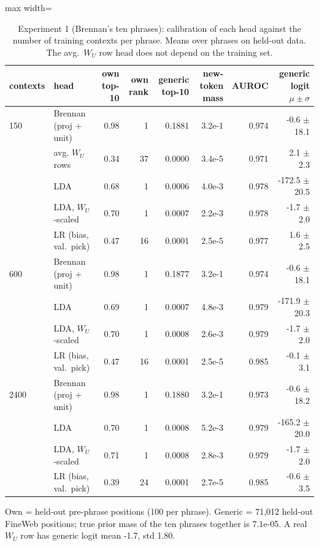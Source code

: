 \begin{table}[t]
\centering
\footnotesize
\caption{Experiment 1 (Brennan's ten phrases): calibration of each head against the number of training contexts per phrase. Means over phrases on held-out data. The avg.\ $W_U$ row head does not depend on the training set.}
\label{tab:e1_headline}
\begin{adjustbox}{max width=\textwidth}
\begin{tabular}{llrrrrrr}
\toprule
contexts & head & own top-10 & own rank & generic top-10 & new-token mass & AUROC & generic logit $\mu\pm\sigma$ \\
\midrule
150 & Brennan (proj + unit) & 0.98 & 1 & 0.1881 & 3.2e-1 & 0.974 & -0.6 $\pm$ 18.1 \\
 & avg. $W_U$ rows & 0.34 & 37 & 0.0000 & 3.4e-5 & 0.971 & 2.1 $\pm$ 2.3 \\
 & LDA & 0.68 & 1 & 0.0006 & 4.0e-3 & 0.978 & -172.5 $\pm$ 20.5 \\
 & LDA, $W_U$-scaled & 0.70 & 1 & 0.0007 & 2.2e-3 & 0.978 & -1.7 $\pm$ 2.0 \\
 & LR (bias, val.\ pick) & 0.47 & 16 & 0.0001 & 2.5e-5 & 0.977 & 1.6 $\pm$ 2.5 \\
\midrule
600 & Brennan (proj + unit) & 0.98 & 1 & 0.1877 & 3.2e-1 & 0.974 & -0.6 $\pm$ 18.1 \\
 & LDA & 0.69 & 1 & 0.0007 & 4.8e-3 & 0.979 & -171.9 $\pm$ 20.3 \\
 & LDA, $W_U$-scaled & 0.70 & 1 & 0.0008 & 2.6e-3 & 0.979 & -1.7 $\pm$ 2.0 \\
 & LR (bias, val.\ pick) & 0.47 & 16 & 0.0001 & 2.5e-5 & 0.985 & -0.1 $\pm$ 3.1 \\
\midrule
2400 & Brennan (proj + unit) & 0.98 & 1 & 0.1880 & 3.2e-1 & 0.973 & -0.6 $\pm$ 18.2 \\
 & LDA & 0.70 & 1 & 0.0008 & 5.2e-3 & 0.979 & -165.2 $\pm$ 20.0 \\
 & LDA, $W_U$-scaled & 0.71 & 1 & 0.0008 & 2.8e-3 & 0.979 & -1.7 $\pm$ 2.0 \\
 & LR (bias, val.\ pick) & 0.39 & 24 & 0.0001 & 2.7e-5 & 0.985 & -0.6 $\pm$ 3.5 \\
\bottomrule
\end{tabular}
\end{adjustbox}
\par\smallskip\begin{minipage}{\textwidth}\footnotesize Own = held-out pre-phrase positions (100 per phrase). Generic = 71,012 held-out FineWeb positions; true prior mass of the ten phrases together is 7.1e-05. A real $W_U$ row has generic logit mean -1.7, std 1.80.\end{minipage}
\end{table}